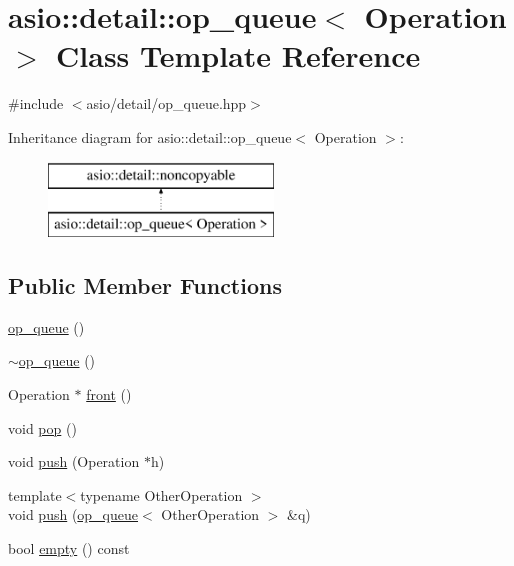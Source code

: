 \hypertarget{classasio_1_1detail_1_1op__queue}{}\section{asio\+:\+:detail\+:\+:op\+\_\+queue$<$ Operation $>$ Class Template Reference}
\label{classasio_1_1detail_1_1op__queue}


{\ttfamily \#include $<$asio/detail/op\+\_\+queue.\+hpp$>$}

Inheritance diagram for asio\+:\+:detail\+:\+:op\+\_\+queue$<$ Operation $>$\+:\begin{figure}[H]
\begin{center}
\leavevmode
\includegraphics[height=2.000000cm]{classasio_1_1detail_1_1op__queue}
\end{center}
\end{figure}
\subsection*{Public Member Functions}
\begin{DoxyCompactItemize}
\item 
\hyperlink{classasio_1_1detail_1_1op__queue_a4e839d0d0521075933dc596f942ac9e0}{op\+\_\+queue} ()
\item 
\hyperlink{classasio_1_1detail_1_1op__queue_a7c8578e462ad95cdfb3c744cf00d3729}{$\sim$op\+\_\+queue} ()
\item 
Operation $\ast$ \hyperlink{classasio_1_1detail_1_1op__queue_aa4d2c28466a70665b6096f8644a6c418}{front} ()
\item 
void \hyperlink{classasio_1_1detail_1_1op__queue_aefd5c63d0ed89c2c3be0f93c5bc6ae3f}{pop} ()
\item 
void \hyperlink{classasio_1_1detail_1_1op__queue_a8678ef4406ead00be2753d860fc83a26}{push} (Operation $\ast$h)
\item 
{\footnotesize template$<$typename Other\+Operation $>$ }\\void \hyperlink{classasio_1_1detail_1_1op__queue_acf5c7649fb185eb4b79d86a0a20d3451}{push} (\hyperlink{classasio_1_1detail_1_1op__queue}{op\+\_\+queue}$<$ Other\+Operation $>$ \&q)
\item 
bool \hyperlink{classasio_1_1detail_1_1op__queue_a1b4cf7482cb5a955e42daf79a2954a09}{empty} () const 
\end{DoxyCompactItemize}
